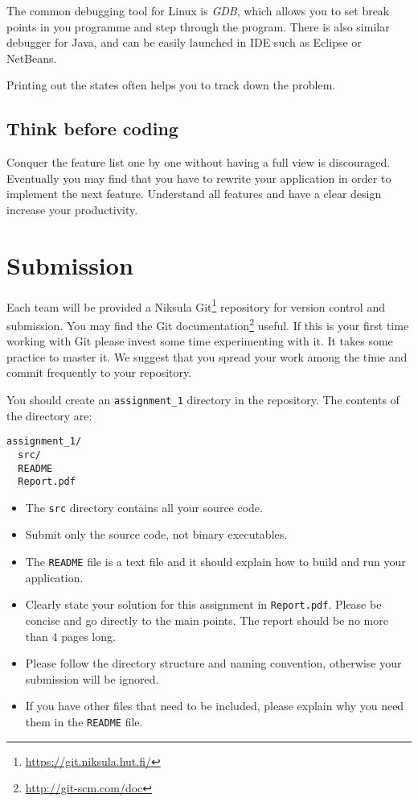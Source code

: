 \documentclass[12pt, a4paper]{article}
\begin{document}
The common debugging tool for Linux is \emph{GDB}, which allows you to set break points in you programme and step through the program.
There is also similar debugger for Java, and can be easily launched in IDE such as Eclipse or NetBeans.

Printing out the states often helps you to track down the problem.

\subsection*{Think before coding}
Conquer the feature list one by one without having a full view is discouraged.
Eventually you may find that you have to rewrite your application in order to implement the next feature.
Understand all features and have a clear design increase your productivity.


\section{Submission}
Each team will be provided a Niksula Git\footnote{\url{https://git.niksula.hut.fi/}} repository for version control and submission.
You may find the Git documentation\footnote{\url{http://git-scm.com/doc}} useful.
If this is your first time working with Git please invest some time experimenting with it.
It takes some practice to master it.
We suggest that you spread your work among the time and commit frequently to your repository.

You should create an \texttt{assignment\_1} directory in the repository.
The contents of the directory are:
\begin{verbatim}
assignment_1/
  src/
  README
  Report.pdf
\end{verbatim}

\begin{itemize}
\item The \texttt{src} directory contains all your source code.
\item Submit only the source code, not binary executables.
\item The \texttt{README} file is a text file and it should explain how to build and run your application.
\item Clearly state your solution for this assignment in \texttt{Report.pdf}. Please be concise and go directly to the main points. The report should be no more than 4 pages long.
\item Please follow the directory structure and naming convention, otherwise your submission will be ignored.
\item If you have other files that need to be included, please explain why you need them in the \texttt{README} file.
\end{itemize}
\end{document}
